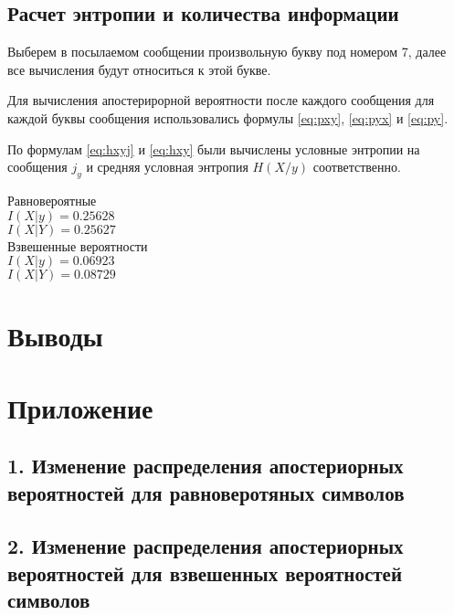 \subsection{Расчет энтропии и количества информации}

Выберем в посылаемом сообщении произвольную букву под номером 7, далее все вычисления будут относиться к этой букве.

Для вычисления апостерирорной вероятности после каждого сообщения для каждой буквы сообщения использовались формулы \ref{eq:pxy}, \ref{eq:pyx} и \ref{eq:py}.

По формулам \ref{eq:hxyj} и \ref{eq:hxy} были вычислены условные энтропии на сообщения $j_y$ и средняя условная энтропия $H(X/y)$ соответственно. 

\begin{multicols}{2}
\begin{center}
Равновероятные\\
$I(X|y) = 0.25628$\\
$I(X|Y) = 0.25627$\\
Взвешенные вероятности\\
$I(X|y) = 0.06923$\\
$I(X|Y) = 0.08729$
\end{center}
\end{multicols}

\section{Выводы}

\section*{Приложение}

\subsection*{1. Изменение распределения апостериорных вероятностей для равноверотяных символов}


\subsection*{2. Изменение распределения апостериорных вероятностей для взвешенных вероятностей символов}



